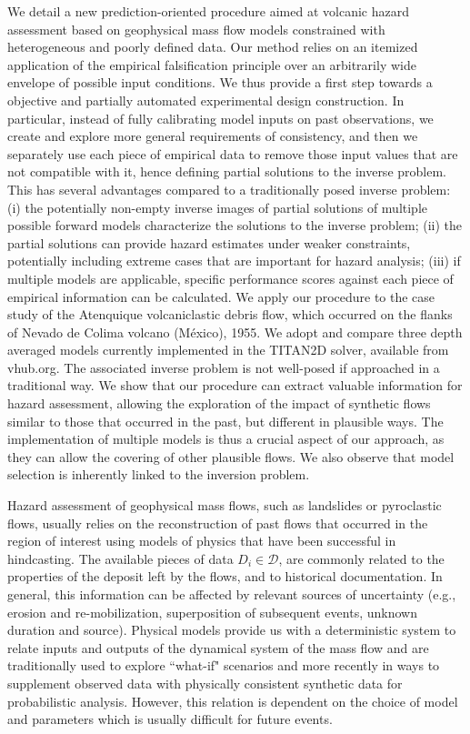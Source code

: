 \documentclass[nhess, manuscript]{copernicus}
\begin{document}
\abstract
We detail a new prediction-oriented procedure aimed at volcanic hazard assessment based on geophysical mass flow models constrained with heterogeneous and poorly defined data. Our method relies on an itemized application of the empirical falsification principle over an arbitrarily wide envelope of possible input conditions. We thus provide a first step towards a objective and partially automated experimental design construction. In particular, instead of fully calibrating model inputs on past observations, we create and explore more general requirements of consistency, and then we separately use each piece of empirical data to remove those input values that are not compatible with it, hence defining partial solutions to the inverse problem. This has several advantages compared to a traditionally posed inverse problem: (i) the potentially non-empty  inverse images of partial solutions of multiple possible forward models characterize the solutions to the inverse problem; (ii) the partial solutions can provide hazard estimates under weaker constraints, potentially including extreme cases that are important for hazard analysis; (iii) if multiple models are applicable, specific performance scores against each piece of empirical information can be calculated. We apply our procedure to the case study of the Atenquique volcaniclastic debris flow, which occurred on the flanks of Nevado de Colima volcano (M\'exico), 1955. We adopt and compare three depth averaged models currently implemented in the TITAN2D solver, available from vhub.org. The associated inverse problem is not well-posed if approached in a traditional way. We show that our procedure can extract valuable information for hazard assessment, allowing the exploration of the impact of synthetic flows similar to those that occurred in the past, but different in plausible ways. The implementation of multiple models is thus a crucial aspect of our approach, as they can allow the covering of other plausible flows. We also observe that model selection is inherently linked to the inversion problem.


\newpage
\introduction
Hazard assessment of geophysical mass flows, such as landslides or pyroclastic flows, usually relies on the reconstruction of past flows that occurred in the region of interest using models of physics that have been successful in hindcasting. The available pieces of data $D_i\in\mathcal D$, are commonly related to the properties of the deposit left by the flows, and to historical documentation. In general, this information can be affected by relevant sources of uncertainty (e.g., erosion and re-mobilization, superposition of subsequent events, unknown duration and source). Physical models provide us with a deterministic system to relate inputs and outputs of the dynamical system of the mass flow \citep{Gilbert91, Patra2018a} and are traditionally used to explore ``what-if" scenarios and more recently in ways to supplement observed data with physically consistent synthetic data \citep{Bayarri2015} for probabilistic analysis. However, this relation is dependent on the choice of model and parameters which is usually difficult for future events.
\end{document}

